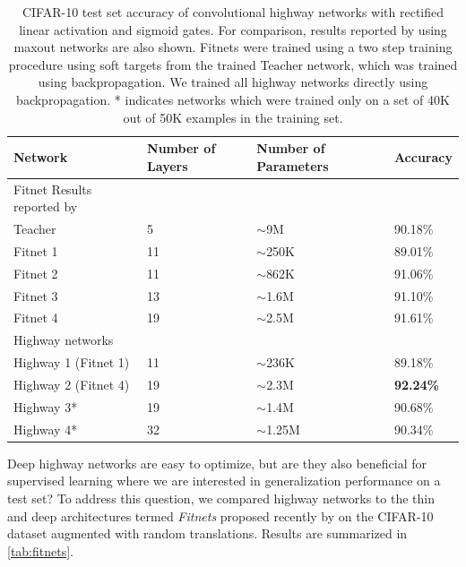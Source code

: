 \documentclass{article}
\begin{document}
\begin{table}
	\centering
    \begin{tabular}{llll}
    \hline
    Network                                 & Number of Layers & Number of Parameters   & Accuracy \\ \hline
    Fitnet Results reported by \citet{Romero2014}  & ~                & ~                      & ~        \\
    \quad Teacher                                 & 5                & $\sim$9M    & 90.18\%  \\
    \quad Fitnet 1                                & 11               & $\sim$250K  & 89.01\%  \\
    \quad Fitnet 2                                & 11               & $\sim$862K  & 91.06\%  \\
    \quad Fitnet 3                                & 13               & $\sim$1.6M  & 91.10\%  \\
    \quad Fitnet 4                                & 19               & $\sim$2.5M  & 91.61\%  \\
    Highway networks                        & ~                & ~                      & ~        \\
    \quad Highway 1 (Fitnet 1)                    & 11               & $\sim$236K  & 89.18\%  \\
    \quad Highway 2 (Fitnet 4)                    & 19               & $\sim$2.3M  & \textbf{92.24\%}  \\
    \quad Highway 3*                               & 19               & $\sim$1.4M  & 90.68\%        \\
    \quad Highway 4*                               & 32               & $\sim$1.25M & 90.34\%        \\ \hline
    \end{tabular}
    \caption{CIFAR-10 test set accuracy of convolutional highway networks with rectified linear activation and sigmoid gates. For comparison, results reported by \citet{Romero2014} using maxout networks are also shown. Fitnets were trained using a two step training procedure using soft targets from the trained Teacher network, which was trained using backpropagation. We trained all highway networks directly using backpropagation. * indicates networks which were trained only on a set of 40K out of 50K examples in the training set.}
    \label{tab:fitnets}
\end{table}

Deep highway networks are easy to optimize, but are they also beneficial for supervised learning where we are interested in generalization performance on a test set? To address this question, we compared highway networks to the thin and deep architectures termed \emph{Fitnets} proposed recently by \citet{Romero2014} on the CIFAR-10 dataset augmented with random translations. Results are summarized in \autoref{tab:fitnets}.
\end{document}

